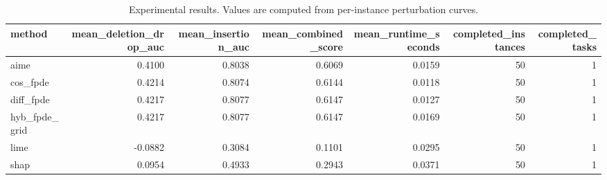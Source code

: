 \begin{table}[t]
\caption{Experimental results. Values are computed from per-instance perturbation curves.}
\label{tab:main_results_computed}
\centering
\begin{tabular}{lrrrrrr}
\toprule
method & mean\_deletion\_drop\_auc & mean\_insertion\_auc & mean\_combined\_score & mean\_runtime\_seconds & completed\_instances & completed\_tasks \\
\midrule
aime & 0.4100 & 0.8038 & 0.6069 & 0.0159 & 50 & 1 \\
cos\_fpde & 0.4214 & 0.8074 & 0.6144 & 0.0118 & 50 & 1 \\
diff\_fpde & 0.4217 & 0.8077 & 0.6147 & 0.0127 & 50 & 1 \\
hyb\_fpde\_grid & 0.4217 & 0.8077 & 0.6147 & 0.0169 & 50 & 1 \\
lime & -0.0882 & 0.3084 & 0.1101 & 0.0295 & 50 & 1 \\
shap & 0.0954 & 0.4933 & 0.2943 & 0.0371 & 50 & 1 \\
\bottomrule
\end{tabular}

\end{table}
